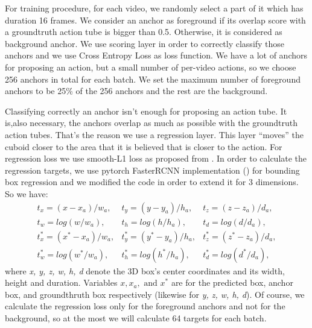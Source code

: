 For training procedure, for each video, we randomly select a part of it which has duration 16 frames. We consider an anchor as foreground if its overlap score with a groundtruth
action tube is bigger than 0.5. Otherwise, it is considered as background anchor. We use scoring layer in order to correctly classify those anchors and we use
Cross Entropy Loss as loss function. We have a lot of anchors for proposing an action, but a small number of per-video actions, so we choose 256 anchors in total for each batch. We set the maximum
number of foreground anchors to be  25\% of the 256 anchors and the rest are the background.\par
Classifying correctly an anchor isn't enough for proposing an action tube. It is,also necessary, the anchors  overlap as much as possible with the groundtruth action tubes. That's the reason we use a
regression layer. This layer ``moves'' the cuboid closer to the area that it is believed that is closer to the action.
For regression loss we use smooth-L1 loss as proposed from \cite{DBLP:journals/corr/GirshickDDM13}. In order to calculate
the regression targets, we use pytorch FasterRCNN implementation (\cite{jjfaster2rcnn}) for bounding box regression and 
we modified the code in order to extend it for 3 dimensions. %
So we have:
\[ \begin{matrix}
    t_x = (x-x_a)/w_a, & t_y = (y-y_a)/h_a, & t_z= (z-z_a)/d_a, \\
    t_w= log(w/w_a), & t_h= log(h/h_a), & t_d = log(d/d_a), \\
    t^*_x = (x^* - x_a)/w_a, & t^*_y = (y^* - y_a)/h_a, & t^*_z = (z^* - z_a)/d_a, \\
    t^*_w = log(w^* /w_a), & t^*_h = log(h^*/h_a), & t^*_d = log(d^*/d_a),
  \end{matrix}
\]
where \textit{x, y, z, w, h, d} denote the 3D box's center coordinates and its width, height and duration. Variables $x, x_a, \text{ and } x^*$
are for the predicted box, anchor box, and groundthruth box respectively (likewise for \textit{y, z, w, h, d}). Of course, we calculate the
regression loss only for the foreground anchors and not for the background, so at the most we will calculate 64 targets
for each batch. \par


